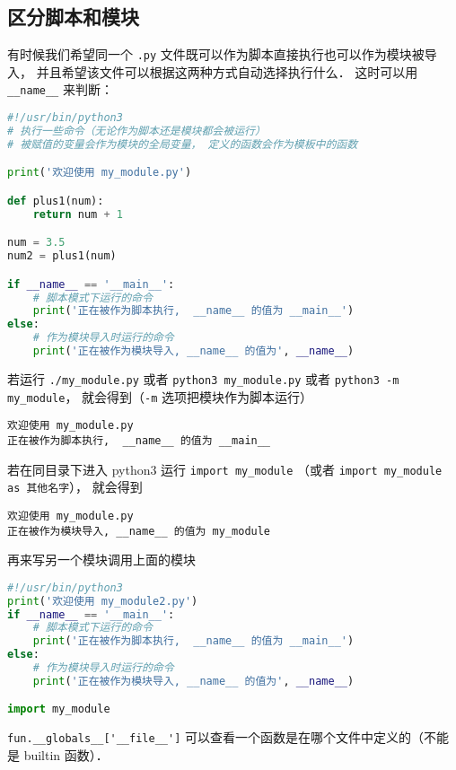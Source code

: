
\begin{issues}
\issueDraft
\end{issues}

\subsection{区分脚本和模块}
有时候我们希望同一个 \verb|.py| 文件既可以作为脚本直接执行也可以作为模块被导入， 并且希望该文件可以根据这两种方式自动选择执行什么． 这时可以用 \verb|__name__| 来判断：
\begin{lstlisting}[language=python, caption=my\_module.py]
#!/usr/bin/python3
# 执行一些命令（无论作为脚本还是模块都会被运行）
# 被赋值的变量会作为模块的全局变量， 定义的函数会作为模板中的函数

print('欢迎使用 my_module.py')

def plus1(num):
    return num + 1

num = 3.5
num2 = plus1(num)

if __name__ == '__main__':
    # 脚本模式下运行的命令
    print('正在被作为脚本执行,  __name__ 的值为 __main__')
else:
    # 作为模块导入时运行的命令
    print('正在被作为模块导入, __name__ 的值为', __name__)
\end{lstlisting}
若运行 \verb|./my_module.py| 或者 \verb|python3 my_module.py| 或者 \verb|python3 -m my_module|， 就会得到（\verb|-m| 选项把模块作为脚本运行）
\begin{lstlisting}[language=none]
欢迎使用 my_module.py
正在被作为脚本执行,  __name__ 的值为 __main__
\end{lstlisting}
若在同目录下进入 python3 运行 \verb|import my_module| （或者 \verb|import my_module as 其他名字|）， 就会得到
\begin{lstlisting}[language=none]
欢迎使用 my_module.py
正在被作为模块导入, __name__ 的值为 my_module
\end{lstlisting}

再来写另一个模块调用上面的模块
\begin{lstlisting}[language=python]
#!/usr/bin/python3
print('欢迎使用 my_module2.py')
if __name__ == '__main__':
    # 脚本模式下运行的命令
    print('正在被作为脚本执行,  __name__ 的值为 __main__')
else:
    # 作为模块导入时运行的命令
    print('正在被作为模块导入, __name__ 的值为', __name__)

import my_module
\end{lstlisting}

\verb|fun.__globals__['__file__']| 可以查看一个函数是在哪个文件中定义的（不能是 builtin 函数）．
